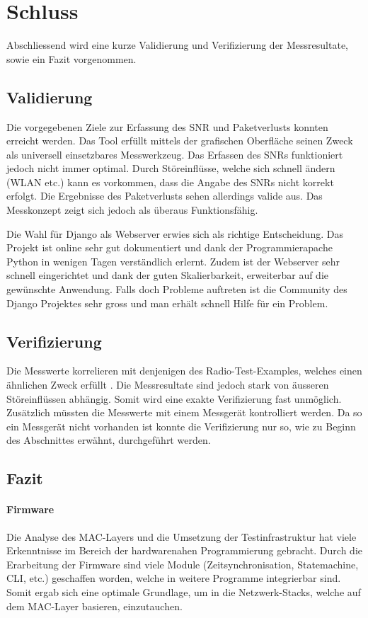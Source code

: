 \newpage
\section{Schluss}\label{sec:SchlussP2P}

Abschliessend wird eine kurze Validierung und Verifizierung der Messresultate, sowie ein Fazit vorgenommen.

\subsection{Validierung}\label{subsec:P2PValidierung}
Die vorgegebenen Ziele zur Erfassung des SNR und Paketverlusts konnten erreicht werden. Das Tool erfüllt mittels der grafischen Oberfläche seinen Zweck als universell einsetzbares Messwerkzeug. Das Erfassen des SNRs funktioniert jedoch nicht immer optimal. Durch Störeinflüsse, welche sich schnell ändern (WLAN etc.) kann es vorkommen, dass die Angabe des SNRs nicht korrekt erfolgt. Die Ergebnisse des Paketverlusts sehen allerdings valide aus. Das Messkonzept zeigt sich jedoch als überaus Funktionsfähig. 

Die Wahl für Django als Webserver erwies sich als richtige Entscheidung. Das Projekt ist online sehr gut dokumentiert und dank der Programmierapache Python in wenigen Tagen verständlich erlernt. Zudem ist der Webserver sehr schnell eingerichtet und dank der guten Skalierbarkeit, erweiterbar auf die gewünschte Anwendung. Falls doch Probleme auftreten ist die Community des Django Projektes sehr gross und man erhält schnell Hilfe für ein Problem.

\subsection{Verifizierung}\label{subsec:P2PVerifizierung}
Die Messwerte korrelieren mit denjenigen des Radio-Test-Examples, welches einen ähnlichen Zweck erfüllt \cite{nrf_connect_sdk_radio_test_example_2020}.
Die Messresultate sind jedoch stark von äusseren Störeinflüssen abhängig. Somit wird eine exakte Verifizierung fast unmöglich. Zusätzlich müssten die Messwerte mit einem Messgerät kontrolliert werden. Da so ein Messgerät nicht vorhanden ist konnte die Verifizierung nur so, wie zu Beginn des Abschnittes erwähnt, durchgeführt werden.

\subsection{Fazit}\label{subsec:FazitP2P}
\paragraph{Firmware}
Die Analyse des MAC-Layers und die Umsetzung der Testinfrastruktur hat viele Erkenntnisse im Bereich der hardwarenahen Programmierung gebracht. Durch die Erarbeitung der Firmware sind viele Module (Zeitsynchronisation, Statemachine, CLI, etc.) geschaffen worden, welche in weitere Programme integrierbar sind. Somit ergab sich eine optimale Grundlage, um in die Netzwerk-Stacks, welche auf dem MAC-Layer basieren, einzutauchen.

